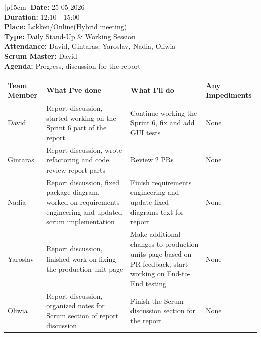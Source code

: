 \begin{table}[H]
    \centering
    \begin{tabular}{|p{15cm}|}   
        \hline
        \textbf{Date:}  25-05-2026 \\
        \textbf{Duration:}  12:10 - 15:00 \\
        \textbf{Place:}  Løkken/Online(Hybrid meeting) \\
        \textbf{Type:} Daily Stand-Up \& Working Session \\
        \textbf{Attendance:} David, Gintaras, Yaroslav, Nadia, Oliwia \\
        \textbf{Scrum Master:}  David \\
        \textbf{Agenda:} Progress, discussion for the report
        \begin{table}[H]
            \begin{tabular}{|p{1.75cm}|p{4cm}|p{4cm}|p{4cm}|}
                \hline
                \cellcolor[HTML]{BFBFBF}  \textbf{Team Member} & \cellcolor[HTML]{BFBFBF}  \textbf{What I've done} & \cellcolor[HTML]{BFBFBF}  \textbf{What I'll do} & \cellcolor[HTML]{BFBFBF}  \textbf{Any Impediments}\\
                \hline
                \cellcolor[HTML]{d4d4d4} David & Report discussion, started working on the Sprint 6 part of the report & Continue working the Sprint 6, fix and add GUI tests & None \\
                \hline
                \cellcolor[HTML]{d4d4d4} Gintaras & Report discussion, wrote refactoring and code review report parts & Review 2 PRs & None \\
                \hline
                \cellcolor[HTML]{d4d4d4} Nadia & Report discussion, fixed package diagram, worked on requirements engineering and updated scrum implementation & Finish requirements engineering and update fixed diagrams text for report & None \\
                \hline
                \cellcolor[HTML]{d4d4d4} Yaroslav & Report discussion, finished work on fixing the production unit page & Make additional changes to production units page based on PR feedback, start working on End-to-End testing & None \\
                \hline
                \cellcolor[HTML]{d4d4d4} Oliwia & Report discussion, organized notes for Scrum section of report discussion & Finish the Scrum discussion section for the report & None \\
                \hline
            \end{tabular}
        \end{table} \\
        \hline
    \end{tabular}
\end{table}

